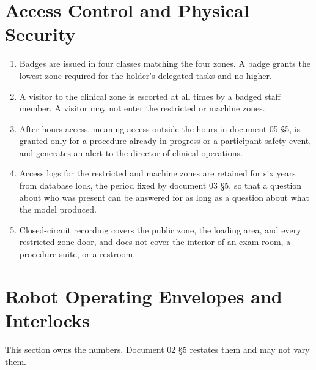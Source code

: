 \section{Access Control and Physical Security}

\begin{enumerate}
\item Badges are issued in four classes matching the four zones. A badge grants
  the lowest zone required for the holder's delegated tasks and no higher.

\item A visitor to the clinical zone is escorted at all times by a badged staff
  member. A visitor may not enter the restricted or machine zones.

\item After-hours access, meaning access outside the hours in document 05 §5, is
  granted only for a procedure already in progress or a participant safety
  event, and generates an alert to the director of clinical operations.

\item Access logs for the restricted and machine zones are retained for six
  years from database lock, the period fixed by document 03 §5, so that a
  question about who was present can be answered for as long as a question about
  what the model produced.

\item Closed-circuit recording covers the public zone, the loading area, and
  every restricted zone door, and does not cover the interior of an exam room, a
  procedure suite, or a restroom.
\end{enumerate}

\section{Robot Operating Envelopes and Interlocks}

This section owns the numbers. Document 02 §5 restates them and may not vary
them.

